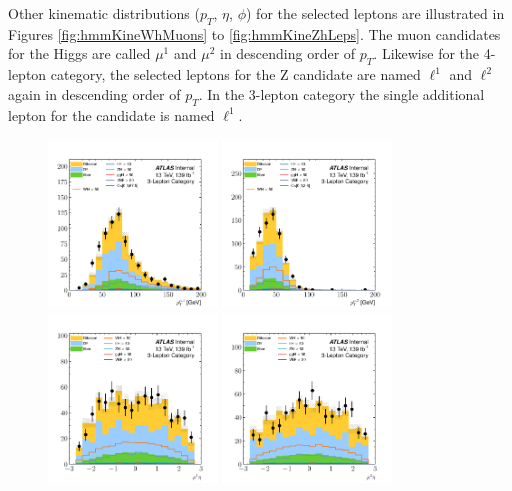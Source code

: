     
Other kinematic distributions ($p_T$, $\eta$, $\phi$) for the selected leptons are illustrated in Figures \ref{fig:hmmKineWhMuons} to \ref{fig:hmmKineZhLeps}.
The muon candidates for the Higgs are called $\mu^1$ and $\mu^2$ in descending order of $p_T$. 
Likewise for the 4-lepton category, the selected leptons for the Z candidate are named $\ell^1$ and $\ell^2$ again in descending order of $p_T$.
In the 3-lepton category the single additional lepton for the \W candidate is named $\ell^1$.




\clearpage
\begin{figure}[htpb]
  \centering
  \includegraphics[width=0.4\textwidth]{figures/hmm/kinematics/histo-3lep-u1_pt.pdf}
  \includegraphics[width=0.4\textwidth]{figures/hmm/kinematics/histo-3lep-u2_pt.pdf}
  \includegraphics[width=0.4\textwidth]{figures/hmm/kinematics/histo-3lep-u1_eta.pdf}
  \includegraphics[width=0.4\textwidth]{figures/hmm/kinematics/histo-3lep-u2_eta.pdf}

\end{figure}
